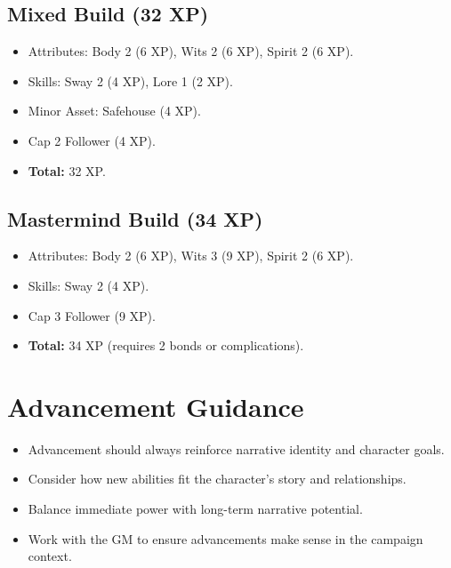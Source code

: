 \subsection{Mixed Build (32 XP)}
\label{subsec:mixed-example}

\begin{itemize}
\item Attributes: Body 2 (6 XP), Wits 2 (6 XP), Spirit 2 (6 XP).
\item Skills: Sway 2 (4 XP), Lore 1 (2 XP).
\item Minor Asset: Safehouse (4 XP).
\item Cap 2 Follower (4 XP).
\item \textbf{Total:} 32 XP.
\end{itemize}

\subsection{Mastermind Build (34 XP)}
\label{subsec:mastermind-example}

\begin{itemize}
\item Attributes: Body 2 (6 XP), Wits 3 (9 XP), Spirit 2 (6 XP).
\item Skills: Sway 2 (4 XP).
\item Cap 3 Follower (9 XP).
\item \textbf{Total:} 34 XP (requires 2 bonds or complications).
\end{itemize}

\section{Advancement Guidance}
\label{sec:advancement-guidance}

\begin{itemize}
\item Advancement should always reinforce narrative identity and character goals.
\item Consider how new abilities fit the character's story and relationships.
\item Balance immediate power with long-term narrative potential.
\item Work with the GM to ensure advancements make sense in the campaign context.
\end{itemize}

